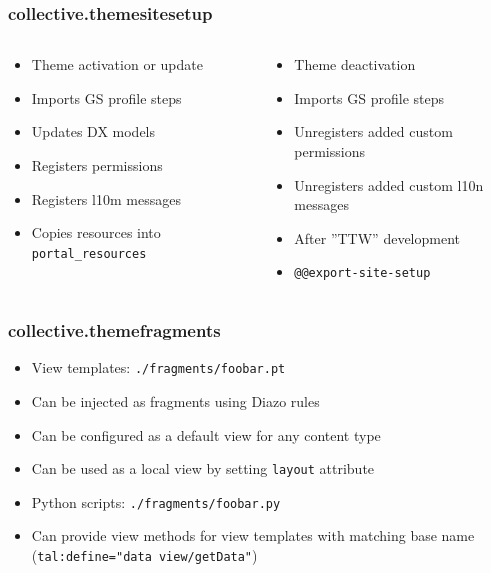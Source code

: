 \documentclass[aspectratio=43]{beamer}
\begin{document}
\begin{frame}[plain,t]
  \frametitle{collective.themesitesetup}
  \begin{columns}[onlytextwidth,t]
  \begin{column}{0.45\textwidth}
  \begin{itemize}[<+->]
  \setlength{\itemsep}{1em}
  \item[] \hspace{-16pt} Theme activation or update
  \item Imports GS profile steps
  \item Updates DX models
  \item Registers permissions
  \item Registers l10m messages
  \item Copies resources into \texttt{portal\_resources}
  \end{itemize}
  \end{column}
  \begin{column}{0.45\textwidth}
  \begin{itemize}[<+->]
  \setlength{\itemsep}{1em}
  \item[] \hspace{-16pt} Theme deactivation
  \item Imports GS profile steps
  \item Unregisters added custom permissions
  \item Unregisters added custom l10n messages
  \end{itemize}
  \begin{itemize}[<+->]
  \setlength{\itemsep}{1em}
  \item[] \hspace{-16pt} After ”TTW” development
  \item \texttt{@@export-site-setup}
  \end{itemize}
  \end{column}
  \end{columns}
\end{frame}

\begin{frame}[plain,t]
  \frametitle{collective.themefragments}
  \begin{itemize}[<+->]
  \setlength{\itemsep}{1em}
  \item[] \hspace{-16pt} View templates: \texttt{./fragments/foobar.pt}
  \item Can be injected as fragments using Diazo rules
  \item Can be configured as a default view for any content type
  \item Can be used as a local view by setting \texttt{layout} attribute
  \item[] \hspace{-16pt} Python scripts: \texttt{./fragments/foobar.py}
  \item Can provide view methods for view templates with matching base name
  (\texttt{tal:define="data view/getData"})
  \end{itemize}
\end{frame}
\end{document}
